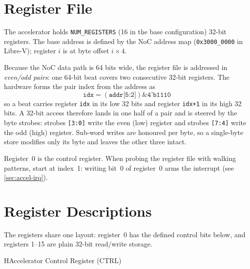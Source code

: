 \section{Register File}
The accelerator holds \texttt{NUM\_REGISTERS} (16 in the base configuration) 32-bit registers. The base
address is defined by the NoC address map (\texttt{0x3000\_0000} in Libre-V); register $i$ is at byte
offset $i \times 4$.

Because the NoC data path is 64 bits wide, the register file is addressed in \emph{even/odd pairs}: one
64-bit beat covers two consecutive 32-bit registers. The hardware forms the pair index from the address
as
\[
  \texttt{idx} = (\texttt{addr[5:2]}) \mathbin{\&} \texttt{4'b1110}
\]
so a beat carries register \texttt{idx} in its low 32 bits and register \texttt{idx+1} in its high 32
bits. A 32-bit access therefore lands in one half of a pair and is steered by the byte strobes: strobes
\texttt{[3:0]} write the even (low) register and strobes \texttt{[7:4]} write the odd (high) register.
Sub-word writes are honoured per byte, so a single-byte store modifies only its byte and leaves the
other three intact.

\begin{docnote}
Register~0 is the control register. When probing the register file with walking patterns, start at
index~1: writing bit~0 of register~0 arms the interrupt (see \autoref{sec:accel-irq}).
\end{docnote}

\section{Register Descriptions}
The registers share one layout: register~0 has the defined control bits below, and registers 1--15 are
plain 32-bit read/write storage.



\begin{register}{H}{Accelerator Control Register (CTRL)}{}



\end{register}

